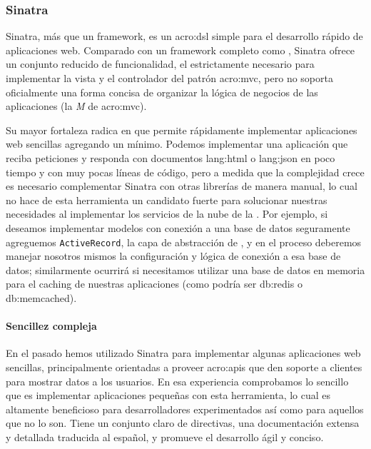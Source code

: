 \subsubsection{Sinatra}
\label{soa:tecnologias:sinatra}

Sinatra, más que un framework, es un \gls{acro:dsl} simple para el desarrollo rápido de aplicaciones web. Comparado con un framework completo como , Sinatra ofrece un conjunto reducido de funcionalidad, el estrictamente necesario para implementar la vista y el controlador del patrón \gls{acro:mvc}, pero no soporta oficialmente una forma concisa de organizar la lógica de negocios de las aplicaciones (la \textit{M} de \gls{acro:mvc}).

Su mayor fortaleza radica en que permite rápidamente implementar aplicaciones web sencillas agregando un  mínimo. Podemos implementar una aplicación que reciba peticiones y responda con documentos \gls{lang:html} o \gls{lang:json} en poco tiempo y con muy pocas líneas de código, pero a medida que la complejidad crece es necesario complementar Sinatra con otras librerías de manera manual, lo cual no hace de esta herramienta un candidato fuerte para solucionar nuestras necesidades al implementar los servicios de la nube de la \unlp. Por ejemplo, si deseamos implementar modelos con conexión a una base de datos seguramente agreguemos \texttt{ActiveRecord}, la capa de abstracción de , y en el proceso deberemos manejar nosotros mismos la configuración y lógica de conexión a esa base de datos; similarmente ocurrirá si necesitamos utilizar una base de datos en memoria para el caching de nuestras aplicaciones (como podría ser \gls{db:redis} o \gls{db:memcached}).

\paragraph{Sencillez compleja}

En el pasado hemos utilizado Sinatra para implementar algunas aplicaciones web sencillas, principalmente orientadas a proveer \glspl{acro:api} que den soporte a clientes para mostrar datos a los usuarios. En esa experiencia comprobamos lo sencillo que es implementar aplicaciones pequeñas con esta herramienta, lo cual es altamente beneficioso para desarrolladores experimentados así como para aquellos que no lo son. Tiene un conjunto claro de directivas, una documentación extensa y detallada traducida al español, y promueve el desarrollo ágil y conciso.

